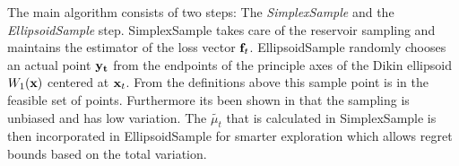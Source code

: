 The main algorithm consists of two steps: The \textit{SimplexSample} and the \textit{EllipsoidSample} step.
SimplexSample takes care of the reservoir sampling and maintains the estimator of the loss vector
${\bf f}_t$. EllipsoidSample randomly chooses an actual point ${\bf y_t}$ from the endpoints of the
principle axes of the Dikin ellipsoid $W_1({\bf x})$ centered at ${\bf x}_t$. From the definitions above this sample point is in the feasible set of points. Furthermore its been shown in \citep{abernethy} that the sampling is unbiased and has low variation. The $\tilde{\mu_t}$ that is calculated in SimplexSample is then incorporated in EllipsoidSample for smarter exploration which allows regret bounds based on the total
variation. 